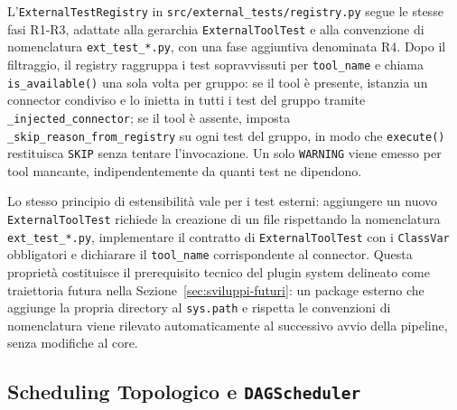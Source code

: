 L'\texttt{ExternalTestRegistry} in \texttt{src/external\_tests/registry.py} segue le stesse fasi R1-R3, adattate alla gerarchia \texttt{ExternalToolTest} e alla convenzione di nomenclatura \texttt{ext\_test\_*.py}, con una fase aggiuntiva denominata R4. Dopo il filtraggio, il registry raggruppa i test sopravvissuti per \texttt{tool\_name} e chiama \texttt{is\_available()} una sola volta per gruppo: se il tool è presente, istanzia un connector condiviso e lo inietta in tutti i test del gruppo tramite \texttt{\_injected\_connector}; se il tool è assente, imposta \texttt{\_skip\_reason\_from\_registry} su ogni test del gruppo, in modo che \texttt{execute()} restituisca \texttt{SKIP} senza tentare l'invocazione. Un solo \texttt{WARNING} viene emesso per tool mancante, indipendentemente da quanti test ne dipendono.

Lo stesso principio di estensibilità vale per i test esterni: aggiungere un nuovo \texttt{ExternalToolTest} richiede la creazione di un file rispettando la nomenclatura \texttt{ext\_test\_*.py}, implementare il contratto di \texttt{ExternalToolTest} con i \texttt{ClassVar} obbligatori e dichiarare il \texttt{tool\_name} corrispondente al connector. Questa proprietà costituisce il prerequisito tecnico del plugin system delineato come traiettoria futura nella Sezione~\ref{sec:sviluppi-futuri}: un package esterno che aggiunge la propria directory al \texttt{sys.path} e rispetta le convenzioni di nomenclatura viene rilevato automaticamente al successivo avvio della pipeline, senza modifiche al core.


\subsection{Scheduling Topologico e \texttt{DAGScheduler}}\label{subsec:dag-impl}

